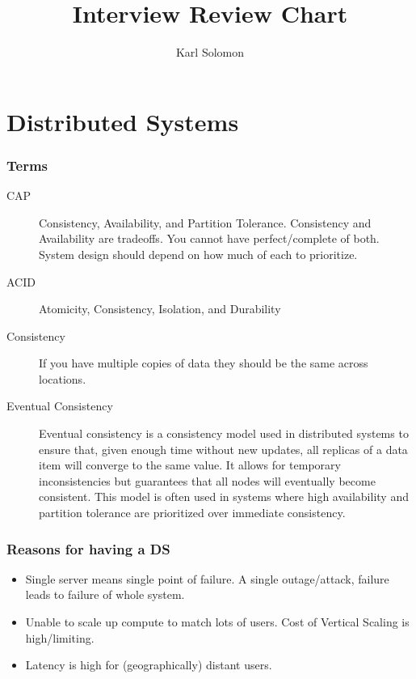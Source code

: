 \documentclass{article}
\begin{document}
\selectfont
\title{Interview Review Chart}
\author{Karl Solomon}
\maketitle
\tableofcontents
\part{Distributed Systems}
\section{Terms}
    \begin{description}
      \item[CAP]
        Consistency, Availability, and Partition Tolerance. Consistency and Availability are tradeoffs. You cannot have perfect/complete of both. System design should depend on how much of each to prioritize.
    \end{description}
    \begin{description}
      \item[ACID]
        Atomicity, Consistency, Isolation, and Durability
    \end{description}
    \begin{description}
      \item[Consistency]
        If you have multiple copies of data they should be the same across locations.
    \end{description}
    \begin{description}
      \item[Eventual Consistency]
        Eventual consistency is a consistency model used in distributed systems to ensure that, given enough time without new updates, all replicas of a data item will converge to the same value. It allows for temporary inconsistencies but guarantees that all nodes will eventually become consistent. This model is often used in systems where high availability and partition tolerance are prioritized over immediate consistency.
    \end{description}

\section{Reasons for having a DS}
    \begin{itemize}
      \item Single server means single point of failure. A single outage/attack, failure leads to failure of whole system.
      \item Unable to scale up compute to match lots of users. Cost of Vertical Scaling is high/limiting.
      \item Latency is high for (geographically) distant users.
    \end{itemize}
\end{document}
